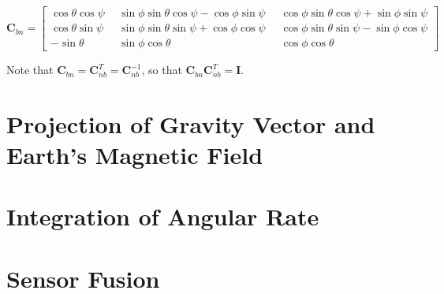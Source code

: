 \begin{equation}
\mathbf{C}_{bn} = {\left[\begin{smallmatrix}
   \cos \theta \cos \psi \; &
    \sin \phi \sin \theta \cos \psi - \cos \phi \sin \psi \; &
    \cos \phi \sin \theta \cos \psi + \sin \phi \sin \psi \\
    \cos \theta \sin \psi \;\; &
    \sin \phi \sin \theta \sin \psi + \cos \phi \cos \psi \;\; &
    \cos \phi \sin \theta \sin \psi - \sin \phi \cos \psi \\
    -\sin \theta \;\; &
    \sin \phi \cos \theta \;\; &
    \cos \phi \cos \theta
  \end{smallmatrix}\right]}
\end{equation}

\noindent
Note that $\mathbf{C}_{bn} = \mathbf{C}^T_{nb} = \mathbf{C}^{-1}_{nb}$, so that $\mathbf{C}^{ }_{bn} \mathbf{C}^T_{nb} = \mathbf{I}$.  


\section{Projection of Gravity Vector and Earth's Magnetic Field}

\section{Integration of Angular Rate}

\section{Sensor Fusion}


